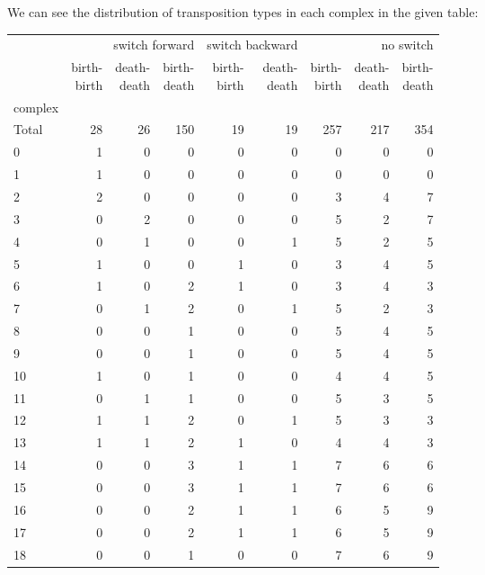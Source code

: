 \documentclass{article}
\begin{document}
\par We can see the distribution of transposition types in each complex in the given table:
\begin{center}
\begin{tabular}{lrrrrrrrr}
\toprule
& \multicolumn{3}{r}{switch forward} & \multicolumn{2}{r}{switch backward} & \multicolumn{3}{r}{no switch} \\
& \makecell{birth-\\birth} & \makecell{death-\\death} & \makecell{birth-\\death} & \makecell{birth-\\birth} & \makecell{death-\\death} & \makecell{birth-\\birth} & \makecell{death-\\death} & \makecell{birth-\\death} \\
complex &  &  &  &  &  &  &  &  \\
\midrule
Total & 28 & 26 & 150 & 19 & 19 & 257 & 217 & 354 \\
0 & 1 & 0 & 0 & 0 & 0 & 0 & 0 & 0 \\
1 & 1 & 0 & 0 & 0 & 0 & 0 & 0 & 0 \\
2 & 2 & 0 & 0 & 0 & 0 & 3 & 4 & 7 \\
3 & 0 & 2 & 0 & 0 & 0 & 5 & 2 & 7 \\
4 & 0 & 1 & 0 & 0 & 1 & 5 & 2 & 5 \\
5 & 1 & 0 & 0 & 1 & 0 & 3 & 4 & 5 \\
6 & 1 & 0 & 2 & 1 & 0 & 3 & 4 & 3 \\
7 & 0 & 1 & 2 & 0 & 1 & 5 & 2 & 3 \\
8 & 0 & 0 & 1 & 0 & 0 & 5 & 4 & 5 \\
9 & 0 & 0 & 1 & 0 & 0 & 5 & 4 & 5 \\
10 & 1 & 0 & 1 & 0 & 0 & 4 & 4 & 5 \\
11 & 0 & 1 & 1 & 0 & 0 & 5 & 3 & 5 \\
12 & 1 & 1 & 2 & 0 & 1 & 5 & 3 & 3 \\
13 & 1 & 1 & 2 & 1 & 0 & 4 & 4 & 3 \\
14 & 0 & 0 & 3 & 1 & 1 & 7 & 6 & 6 \\
15 & 0 & 0 & 3 & 1 & 1 & 7 & 6 & 6 \\
16 & 0 & 0 & 2 & 1 & 1 & 6 & 5 & 9 \\
17 & 0 & 0 & 2 & 1 & 1 & 6 & 5 & 9 \\
18 & 0 & 0 & 1 & 0 & 0 & 7 & 6 & 9 \\

\end{tabular}
\end{center}
\end{document}
